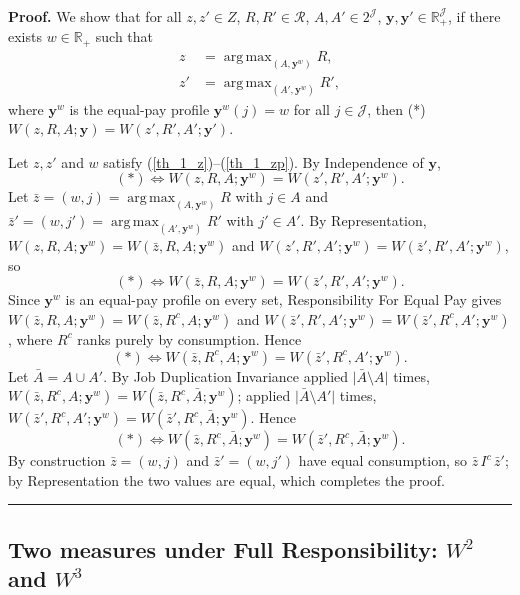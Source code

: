 \documentclass[12pt,thmsb]{article}
\DeclareMathOperator*{\argmax}{arg\,max}
\newenvironment{proof}[1][Proof]{\noindent \textbf{#1.} }{\  \rule{0.5em}{0.5em}}
\begin{document}
\begin{proof}
We show that for all $z,z'\in Z$, $R,R'\in\mathcal R$, $A,A'\in 2^{\mathcal J}$,
$\mathbf y,\mathbf y'\in\mathbb R_+^{\mathcal J}$, if there exists
$w\in\mathbb R_+$ such that
\begin{align}
z&=\argmax_{(A,\mathbf y^w)}R, \label{th_1_z}\\
z'&=\argmax_{(A',\mathbf y^w)}R', \label{th_1_zp}
\end{align}
where $\mathbf y^w$ is the equal-pay profile $\mathbf y^w(j)=w$ for all
$j\in\mathcal J$, then (*) $W(z,R,A;\mathbf y)=W(z',R',A';\mathbf y')$.

Let $z,z'$ and $w$ satisfy (\ref{th_1_z})--(\ref{th_1_zp}). By Independence of
$\mathbf y$,
\begin{equation*}
(*)\Leftrightarrow W(z,R,A;\mathbf y^w)=W(z',R',A';\mathbf y^w).
\end{equation*}
Let $\bar z=(w,j)=\argmax_{(A,\mathbf y^w)}R$ with $j\in A$ and
$\bar z'=(w,j')=\argmax_{(A',\mathbf y^w)}R'$ with $j'\in A'$. By
Representation, $W(z,R,A;\mathbf y^w)=W(\bar z,R,A;\mathbf y^w)$ and
$W(z',R',A';\mathbf y^w)=W(\bar z',R',A';\mathbf y^w)$, so
\begin{equation*}
(*)\Leftrightarrow W(\bar z,R,A;\mathbf y^w)=W(\bar z',R',A';\mathbf y^w).
\end{equation*}
Since $\mathbf y^w$ is an equal-pay profile on every set, Responsibility For
Equal Pay gives $W(\bar z,R,A;\mathbf y^w)=W(\bar z,R^c,A;\mathbf y^w)$ and
$W(\bar z',R',A';\mathbf y^w)=W(\bar z',R^c,A';\mathbf y^w)$, where $R^c$ ranks
purely by consumption. Hence
\begin{equation*}
(*)\Leftrightarrow W(\bar z,R^c,A;\mathbf y^w)=W(\bar z',R^c,A';\mathbf y^w).
\end{equation*}
Let $\bar A=A\cup A'$. By Job Duplication Invariance applied
$\lvert\bar A\setminus A\rvert$ times,
$W(\bar z,R^c,A;\mathbf y^w)=W(\bar z,R^c,\bar A;\mathbf y^w)$; applied
$\lvert\bar A\setminus A'\rvert$ times,
$W(\bar z',R^c,A';\mathbf y^w)=W(\bar z',R^c,\bar A;\mathbf y^w)$. Hence
\begin{equation*}
(*)\Leftrightarrow W(\bar z,R^c,\bar A;\mathbf y^w)=W(\bar z',R^c,\bar
A;\mathbf y^w).
\end{equation*}
By construction $\bar z=(w,j)$ and $\bar z'=(w,j')$ have equal consumption, so
$\bar z\,I^c\,\bar z'$; by Representation the two values are equal, which
completes the proof.
\end{proof}

\subsection{Two measures under Full Responsibility: $W^2$ and $W^3$}
\end{document}
